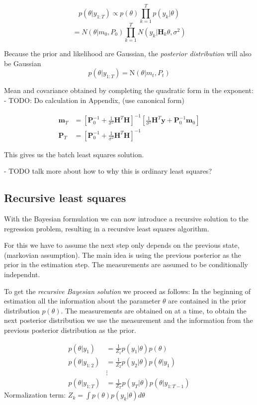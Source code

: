 $$ p(\theta | y_{1:T})  \propto p(\theta) \prod^T_{k=1} p (y_k | \theta) $$
$$ = N(\theta | m_0, P_0) \prod^T_{k=1} N(y_k | \textbf{H}_k \theta, \sigma^2) $$

Because the prior and likelihood are Gaussian, the \textit{posterior distribution}
will also be Gaussian
$$ p(\theta | y_{1:T}) = \text{N}(\theta | m_t, P_t) $$

Mean and covariance obtained by completing the quadratic form in the exponent:
- TODO: Do calculation in Appendix, (use canonical form)

\begin{align}
  \mathbf{m}_T &= \left[ \mathbf{P}^{-1}_0 + \frac{1}{\sigma^2} \mathbf{H}^T \mathbf{H}
                 \right]^{-1} \left[\frac{1}{\sigma^2} \mathbf{H}^T \mathbf{y} +
  \mathbf{P}^{-1}_0 \mathbf{m}_0 \right] \\
  \mathbf{P}_T &= \left[\mathbf{P}_0^{-1} + \frac{1}{\sigma^2} \mathbf{H}^T \mathbf{H}
                 \right]^{-1}
\end{align}

This gives us the batch least squares solution.

- TODO talk more about how to why this is ordinary least squares?

\subsection{Recursive least squares} \label{RLS}
With the Bayesian formulation we can now  introduce a recursive
solution to the regression problem, resulting in a recursive least squares
algorithm.

For this we have to assume the next step only
depends on the previous state, (markovian assumption).
The main idea is using the previous posterior as the prior in the estimation
step.
The measurements are assumed to be conditionally independnt.

To get the \textit{recursive Bayesian solution} we proceed as follows:
In the beginning of estimation all the information about the parameter $\theta$
are contained in the prior distribution $p(\theta)$.
The measurements are obtained on at a time, to
obtain the next posterior distribution we use the measurement and the information
from the previous posterior distribution as the prior.

\begin{align*}
  p(\theta | y_{1}) &= \frac{1}{Z_1} p(y_1 | \theta) p(\theta) \\
  p(\theta | y_{1:2}) &= \frac{1}{Z_2} p(y_2 | \theta) p(\theta | y_1) \\
                    &\vdots \\
  p(\theta | y_{1:T}) &= \frac{1}{Z_T} p(y_T | \theta) p(\theta | y_{1:T-1})
\end{align*}
Normalization term: $Z_k = \int p(\theta) p(y_k | \theta) d\theta$ %


